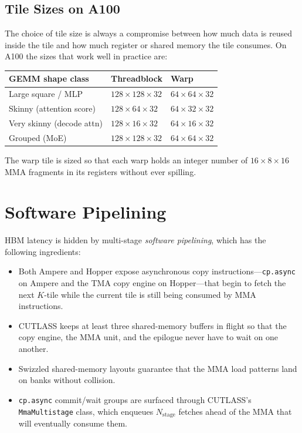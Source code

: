\subsection{Tile Sizes on A100}\label{sec:cutlass_tile_sizes}
The choice of tile size is always a compromise between how much
data is reused inside the tile and how much register or shared
memory the tile consumes. On A100 the sizes that work well in
practice are:
\begin{center}
\begin{tabular}{lll}
\textbf{GEMM shape class}    & \textbf{Threadblock} & \textbf{Warp} \\
\toprule
Large square / MLP           & $128 \times 128 \times 32$ & $64 \times 64 \times 32$ \\
Skinny (attention score)     & $128 \times 64  \times 32$ & $64 \times 32 \times 32$ \\
Very skinny (decode attn)    & $128 \times 16  \times 32$ & $64 \times 16 \times 32$ \\
Grouped (MoE)                & $128 \times 128 \times 32$ & $64 \times 64 \times 32$ \\
\bottomrule
\end{tabular}
\end{center}
The warp tile is sized so that each warp holds an integer number
of $16 \times 8 \times 16$ MMA fragments in its registers without
ever spilling.

\section{Software Pipelining}\label{sec:cutlass_pipelining}
HBM latency is hidden by multi-stage \emph{software pipelining},
which has the following ingredients:
\begin{itemize}
    \item Both Ampere and Hopper expose asynchronous copy
          instructions---\texttt{cp.async} on Ampere and the TMA
          copy engine on Hopper---that begin to fetch the next
          $K$-tile while the current tile is still being consumed
          by MMA instructions.
    \item CUTLASS keeps at least three shared-memory buffers in
          flight so that the copy engine, the MMA unit, and the
          epilogue never have to wait on one another.
    \item Swizzled shared-memory layouts guarantee that the MMA
          load patterns land on banks without collision.
    \item \texttt{cp.async} commit/wait groups are surfaced
          through CUTLASS's \texttt{MmaMultistage} class, which
          enqueues $N_{\text{stage}}$ fetches ahead of the MMA
          that will eventually consume them.
\end{itemize}


